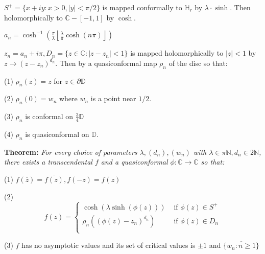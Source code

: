 \documentclass{beamer}
\begin{document}
\begin{frame} 

{\tiny $S^+ = \{ x + iy : x > 0, |y| < \pi/2 \}$ is mapped conformally to $\mathbb{H}_r$ by $\lambda\cdot\sinh$. Then holomorphically to $\mathbb{C} - [-1,1]$ by $\cosh$.

\vspace{1.25mm}

$a_n = \cosh^{-1}\left( \frac{\pi}{\lambda} \left \lfloor{ \frac{\lambda}{\pi} \cosh(n\pi) }\right \rfloor \right)$

\vspace{1.25mm}

$z_n = a_n + i\pi, D_n = \{ z \in \mathbb{C} : \left| z - z_n \right| < 1\} $ is mapped holomorphically to $|z|<1$ by $z\rightarrow (z - z_n)^{d_n}$. Then by a quasiconformal map $\rho_n$ of the disc so that: 

\hspace{5mm} (1) $\rho_n(z)=z$ for $z\in\partial\mathbb{D}$

\hspace{5mm} (2) $\rho_n(0)=w_n$ where $w_n$ is a point near $1/2$.

\hspace{5mm} (3) $\rho_n$ is conformal on $\frac{3}{4}\mathbb{D}$

\hspace{5mm} (4) $\rho_n$ is quasiconformal on $\mathbb{D}$.  

}

\vspace{5mm}

{\bf Theorem:}  {\it For every choice of parameters $\lambda, (d_n), (w_n)$ with $\lambda \in \pi\mathbb{N}, d_n \in 2\mathbb{N}$, there exists a transcendental $f$ and a quasiconformal $\phi: \mathbb{C}\rightarrow\mathbb{C}$ so that:}

\hspace{5mm} (1) $f(\overline{z}) = \overline{f(z)}, f(-z)=f(z)$

\hspace{5mm} (2) \[ f(z) = \begin{cases} 
      \cosh(\lambda\sinh(\phi(z))) & \textrm{ if } \phi(z)\in S^+ \\
      \rho_n((\phi(z)-z_n)^{d_n}) & \textrm{ if } \phi(z)\in D_n \\
   \end{cases} \]
   
\hspace{5mm} (3) $f$ has no asymptotic values and its set of critical values is $\pm1$ and $\overline{\{w_n: n \geq 1\}}$

\end{frame}
\end{document}
